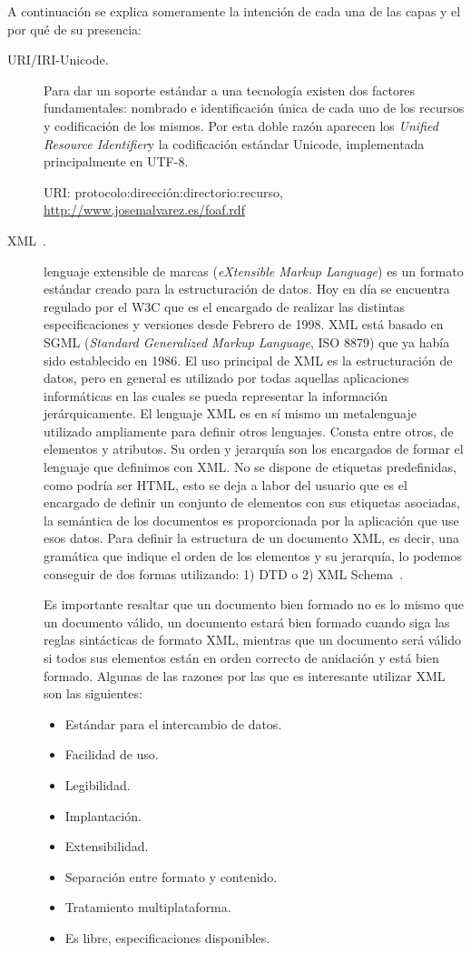 A continuación se explica someramente la intención de cada una de las capas y el por qué
de su presencia:
\begin{description}
\item[\gls{URI}/\gls{IRI}-Unicode.] Para dar un soporte estándar a una tecnología existen
dos factores fundamentales: nombrado e identificación única de cada uno de los
recursos y codificación de los mismos. Por esta doble razón aparecen los \textit{Unified
Resource Identifier}y la codificación estándar Unicode, implementada principalmente en UTF-8.
\begin{example}
URI: protocolo:dirección:directorio:recurso, \url{http://www.josemalvarez.es/foaf.rdf}
\end{example}

\item[\gls{XML}~\cite{XML11}.] lenguaje extensible de marcas (\textit{eXtensible Markup
Language}) es un formato estándar creado para la estructuración de datos.
Hoy en día se encuentra regulado por el \gls{W3C} que es el encargado de realizar las distintas
especificaciones y versiones desde Febrero de 1998. XML está basado en \gls{SGML}
(\textit{Standard Generalized Markup Language}, ISO 8879) que ya había sido establecido
en 1986. El uso principal de XML es la estructuración de datos, pero en general es utilizado por todas
aquellas aplicaciones informáticas en las cuales se pueda representar la información jerárquicamente.
El lenguaje XML es en sí mismo un metalenguaje utilizado ampliamente para definir otros
lenguajes. Consta entre otros, de elementos y atributos. Su orden y jerarquía
son los encargados de formar el lenguaje que definimos con XML. No se dispone de etiquetas predefinidas, como podría ser \gls{HTML}, esto
se deja a labor del usuario que es el encargado de definir un conjunto de elementos con sus
etiquetas asociadas, la semántica de los documentos es proporcionada por la aplicación que use
esos datos. Para definir la estructura de un documento XML, es decir, una 
gramática que indique el orden de los elementos y su jerarquía, lo podemos conseguir de
dos formas utilizando: 1) \gls{DTD} o 2) \gls{XML Schema}~\cite{XMLSchema}.

Es importante resaltar que un documento bien formado no es lo mismo que un documento
válido, un documento estará bien formado cuando siga las reglas sintácticas de
formato XML, mientras que un documento será válido si todos sus elementos están en orden correcto de anidación y está bien formado. Algunas de las razones 
por las que es interesante utilizar XML son las siguientes:
\begin{itemize}
\item Estándar para el intercambio de datos.
\item Facilidad de uso.
\item Legibilidad.
\item Implantación.
\item Extensibilidad.
\item Separación entre formato y contenido.
\item Tratamiento multiplataforma.
\item Es libre, especificaciones disponibles. 
\end{itemize}


\end{description}
